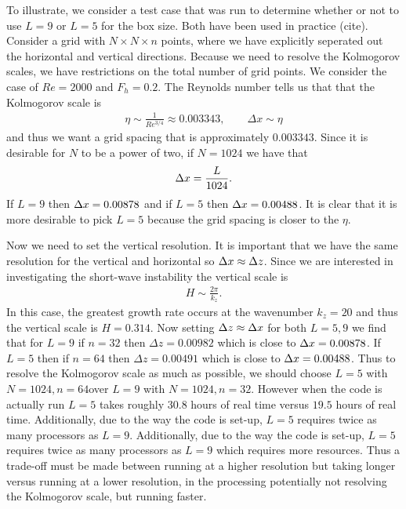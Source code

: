 To illustrate, we consider a test case that was run to determine whether or not to use $L=9$ or $L=5$ for the box size. Both have been used in practice (cite). Consider a grid with $N\times N \times n$ points, where we have explicitly seperated out the horizontal and vertical directions. Because we need to resolve the Kolmogorov scales, we have restrictions on the total number of grid points. We consider the case of $Re=2000$ and $F_{h}=0.2$. The Reynolds number tells us that that the Kolmogorov scale is
\begin{align}
\eta \sim \frac{1}{Re^{3/4}} \approx 0.003343,\qquad \Delta x \sim \eta 
\end{align}
and thus we want a grid spacing that is approximately $0.003343$. Since it is desirable for $N$ to be a power of two, if $N=1024$ we have that 
\begin{align}
\Delta x = \frac{L}{1024}.
\end{align}
If $L=9$ then $\Delta x=0.00878$ and if $L=5$ then $\Delta x=0.00488$. It is clear that it is more desirable to pick $L=5$ because the grid spacing is closer to the $\eta$. 

Now we need to set the vertical resolution. It is important that we have the same resolution for the vertical and horizontal so $\Delta x \approx \Delta z$. Since we are interested in investigating the short-wave instability the vertical scale is 
\begin{align}
H \sim \frac{2\pi}{k_{z}}.
\end{align}
In this case, the greatest growth rate occurs at the wavenumber $k_{z}=20$ and thus the vertical scale is $H=0.314$. Now setting $\Delta z \approx \Delta x$ for both $L=5,9$ we find that for $L=9$ if $n=32$ then $\Delta z=0.00982$ which is close to $\Delta x=0.00878$. If $L=5$ then if $n=64$ then $\Delta z=0.00491$ which is close to $\Delta x=0.00488$. Thus to resolve the Kolmogorov scale as much as possible, we should choose $L=5$ with $N=1024, n=64$over $L=9$ with $N=1024, n=32$. However when the code is actually run $L=5$ takes roughly $30.8$ hours of real time versus $19.5$ hours of real time. Additionally, due to the way the code is set-up, $L=5$ requires twice as many processors as $L=9$. Additionally, due to the way the code is set-up, $L=5$ requires twice as many processors as $L=9$ which requires more resources. Thus a trade-off must be made between running at a higher resolution but taking longer versus running at a lower resolution, in the processing potentially not resolving the Kolmogorov scale, but running faster. 

